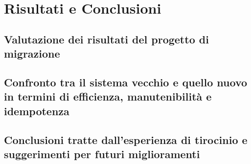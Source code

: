 \chapter{Risultati e Conclusioni}
\label{cha:conclusioni}

\section{Valutazione dei risultati del progetto di migrazione}
\label{sec:valutazione}

\section{Confronto tra il sistema vecchio e quello nuovo in termini di
efficienza, manutenibilità e idempotenza}
\label{sec:confronto}

\section{Conclusioni tratte dall'esperienza di tirocinio e suggerimenti per
futuri miglioramenti}
\label{sec:suggerimenti}